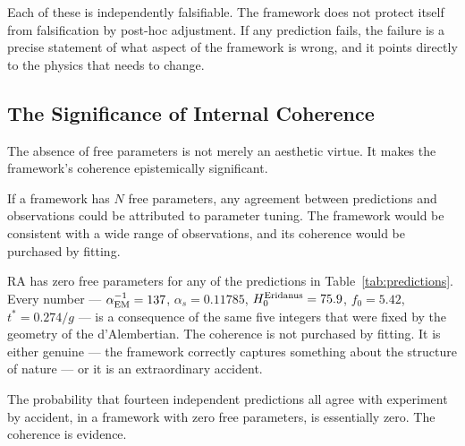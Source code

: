 \documentclass[12pt,a4paper]{article}
\begin{document}
Each of these is independently falsifiable.  The framework does not protect itself from falsification by post-hoc adjustment.  If any prediction fails, the failure is a precise statement of what aspect of the framework is wrong, and it points directly to the physics that needs to change.

\subsection{The Significance of Internal Coherence}

The absence of free parameters is not merely an aesthetic virtue.  It makes the framework's coherence epistemically significant.

If a framework has $N$ free parameters, any agreement between predictions and observations could be attributed to parameter tuning.  The framework would be consistent with a wide range of observations, and its coherence would be purchased by fitting.

RA has zero free parameters for any of the predictions in Table~\ref{tab:predictions}.  Every number --- $\alpha_{\rm EM}^{-1}=137$, $\alpha_s=0.11785$, $H_0^{\rm Eridanus}=75.9$, $f_0=5.42$, $t^*=0.274/g$ --- is a consequence of the same five integers that were fixed by the geometry of the d'Alembertian.  The coherence is not purchased by fitting.  It is either genuine --- the framework correctly captures something about the structure of nature --- or it is an extraordinary accident.

The probability that fourteen independent predictions all agree with experiment by accident, in a framework with zero free parameters, is essentially zero.  The coherence is evidence.
\end{document}
